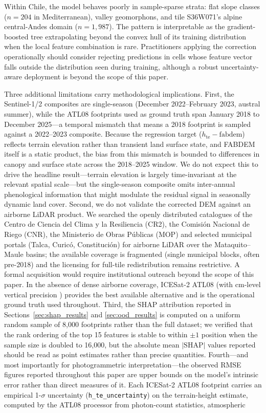 \documentclass[preprint,authoryear,number]{elsarticle}
\begin{document}
Within Chile, the model behaves poorly in sample-sparse strata: flat slope classes ($n = 204$ in Mediterranean), valley geomorphons, and tile S36W071's alpine central-Andes domain ($n = 1{,}987$). The pattern is interpretable as the gradient-boosted tree extrapolating beyond the convex hull of its training distribution when the local feature combination is rare. Practitioners applying the correction operationally should consider rejecting predictions in cells whose feature vector falls outside the distribution seen during training, although a robust uncertainty-aware deployment is beyond the scope of this paper.

Three additional limitations carry methodological implications. First, the Sentinel-1/2 composites are single-season (December 2022--February 2023, austral summer), while the ATL08 footprints used as ground truth span January 2018 to December 2025---a temporal mismatch that means a 2018 footprint is sampled against a 2022--2023 composite. Because the regression target ($h_{\text{te}} - \mathrm{fabdem}$) reflects terrain elevation rather than transient land surface state, and FABDEM itself is a static product, the bias from this mismatch is bounded to differences in canopy and surface state across the 2018--2025 window. We do not expect this to drive the headline result---terrain elevation is largely time-invariant at the relevant spatial scale---but the single-season composite omits inter-annual phenological information that might modulate the residual signal in seasonally dynamic land cover. Second, we do not validate the corrected DEM against an airborne LiDAR product. We searched the openly distributed catalogues of the Centro de Ciencia del Clima y la Resiliencia (CR2), the Comisi\'on Nacional de Riego (CNR), the Ministerio de Obras P\'ublicas (MOP) and selected municipal portals (Talca, Curic\'o, Constituci\'on) for airborne LiDAR over the Mataquito--Maule basins; the available coverage is fragmented (single municipal blocks, often pre-2018) and the licensing for full-tile redistribution remains restrictive. A formal acquisition would require institutional outreach beyond the scope of this paper. In the absence of dense airborne coverage, ICESat-2 ATL08 (with cm-level vertical precision \citealt{Markus2017ICESat2,Neuenschwander2019ATL08}) provides the best available alternative and is the operational ground truth used throughout. Third, the SHAP attribution reported in Sections~\ref{sec:shap_results} and \ref{sec:ood_results} is computed on a uniform random sample of 8{,}000 footprints rather than the full dataset; we verified that the rank ordering of the top 15 features is stable to within $\pm 1$ position when the sample size is doubled to 16{,}000, but the absolute mean $\lvert\mathrm{SHAP}\rvert$ values reported should be read as point estimates rather than precise quantities. Fourth---and most importantly for photogrammetric interpretation---the observed RMSE figures reported throughout this paper are upper bounds on the model's intrinsic error rather than direct measures of it. Each ICESat-2 ATL08 footprint carries an empirical 1-$\sigma$ uncertainty (\texttt{h\_te\_uncertainty}) on the terrain-height estimate, computed by the ATL08 processor from photon-count statistics, atmospheric 
\end{document}
